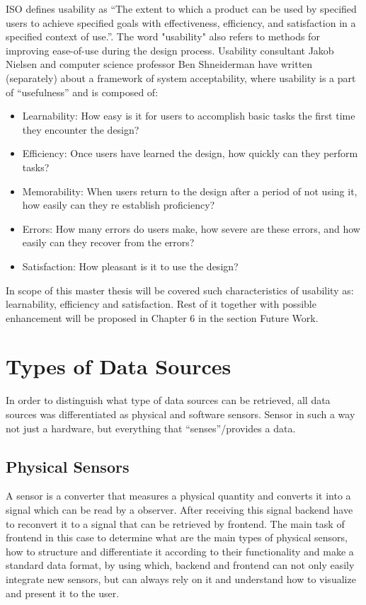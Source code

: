 	ISO defines usability as ``The extent to which a product can be used by specified users to achieve specified goals with effectiveness, efficiency, and satisfaction in a specified context of use.''. The word "usability" also refers to methods for improving ease-of-use during the design process. Usability consultant Jakob Nielsen and computer science professor Ben Shneiderman have written (separately) about a framework of system acceptability, where usability is a part of ``usefulness'' and is composed of\cite{jakob}:
	\begin{itemize}
	\item Learnability: How easy is it for users to accomplish basic tasks the first time they encounter the design?
	\item Efficiency: Once users have learned the design, how quickly can they perform tasks?
	\item Memorability: When users return to the design after a period of not using it, how easily can they re establish proficiency?
	\item Errors: How many errors do users make, how severe are these errors, and how easily can they recover from the errors?
	\item Satisfaction: How pleasant is it to use the design?
	\end{itemize}

	In scope of this master thesis will be covered such characteristics of usability as: learnability, efficiency and satisfaction. Rest of it together with possible enhancement will be proposed in Chapter 6 in the section Future Work.

\section {Types of Data Sources}
    In order to distinguish what type of data sources can be retrieved, all data sources was differentiated as physical and software sensors. Sensor in such a way not just a hardware, but everything that ``senses''/provides a data.

	\subsection {Physical Sensors}
	A sensor is a converter that measures a physical quantity and converts it into a signal which can be read by a observer. After receiving this signal backend have to reconvert it to a signal that can be retrieved by frontend. The main task of frontend in this case to determine what are the main types of physical sensors, how to structure and differentiate it according to their functionality and make a standard data format, by using which, backend and frontend can not only easily integrate new sensors, but can always rely on it and understand how to visualize and present it to the user.
    
